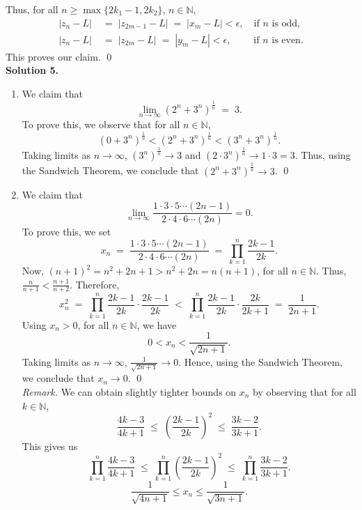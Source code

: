 \documentclass[10pt]{article}
\begin{document}
        Thus, for all $n \ge \max\{2k_1 - 1, 2k_2\}$, $n \in \mathbb{N}$,
        \begin{align*}
                |z_{n} - L| \;&=\; |z_{2m - 1} - L| \;=\; |x_m - L| < \epsilon, \quad\text{if }n\text{ is odd}, \\
                |z_{n} - L| \;&=\; |z_{2m} - L| \;=\; |y_m - L| < \epsilon, \;\!\quad\quad\text{if }n\text{ is even}.
        \end{align*}
        This proves our claim. \qed\\

        \textbf{Solution 5.}
        \begin{enumerate}
                \item We claim that
                \[\lim_{n\to\infty} (2^n + 3^n)^{\frac{1}{n}} \;=\; 3.\]
                To prove this, we observe that for all $n \in \mathbb{N}$,
                \[(0 + 3^n)^{\frac{1}{n}} < (2^n + 3^n)^{\frac{1}{n}} < (3^n + 3^n)^{\frac{1}{n}}.\]
                Taking limits as $n \to \infty$, $(3^n)^{\frac{1}{n}} \to 3$ and $(2\cdot 3^n)^{\frac{1}{n}} \to 1\cdot 3 = 3$.
                Thus, using the Sandwich Theorem, we conclude that $(2^n + 3^n)^{\frac{1}{n}} \to 3$. \qed\\

                \item We claim that
                \[
                \lim_{n\to\infty}\frac{1\cdot 3\cdot 5\cdots (2n - 1)}{2\cdot 4\cdot 6\cdots (2n)} = 0.
                \]
                To prove this, we set
                \[
                x_n \;=\; \frac{1\cdot 3\cdot 5\cdots (2n - 1)}{2\cdot 4\cdot 6\cdots (2n)} \;=\; \prod_{k = 1}^n \frac{2k - 1}{2k}.
                \]
                Now, $(n + 1)^2 = n^2 + 2n + 1 > n^2 + 2n = n(n + 1)$, for all $n \in \mathbb{N}$. Thus, $ \frac{n}{n+1} < \frac{n+1}{n+2}$.
                Therefore,
                \[
                x_n^2   \;=\; \prod_{k = 1}^n \frac{2k - 1}{2k} \cdot \frac{2k - 1}{2k}
                        \;<\; \prod_{k = 1}^n \frac{2k - 1}{2k} \cdot \frac{2k}{2k + 1}
                        \;=\; \frac{1}{2n + 1}.
                \]
                Using $x_n > 0$, for all $n \in \mathbb{N}$, we have
                \[
                0 < x_n < \frac{1}{\sqrt{2n + 1}}.
                \]
                Taking limits as $n \to \infty$, $\frac{1}{\sqrt{2n + 1}} \to 0$. Hence, using the Sandwich Theorem,
                we conclude that $x_n \to 0$. \qed\\

                \textit{Remark.}  We can obtain slightly tighter bounds on $x_n$ by observing that for all $k \in \mathbb{N}$,
                \[
                \frac{4k - 3}{4k + 1} \;\le\;\left( \frac{2k - 1}{2k}  \right)^2 \;\le\; \frac{3k - 2}{3k + 1}.
                \]
                This gives us
                \[
                \prod_{k = 1}^n \frac{4k - 3}{4k + 1} \;\le\; \prod_{k = 1}^n \left(\frac{2k - 1}{2k}\right)^2
                        \;\le\; \prod_{k = 1}^n \frac{3k - 2}{3k + 1}.
                \]
                \[\frac{1}{\sqrt{4n + 1}} \le x_n \le \frac{1}{\sqrt{3n + 1}}.\]
        \end{enumerate}
        
\end{document}
